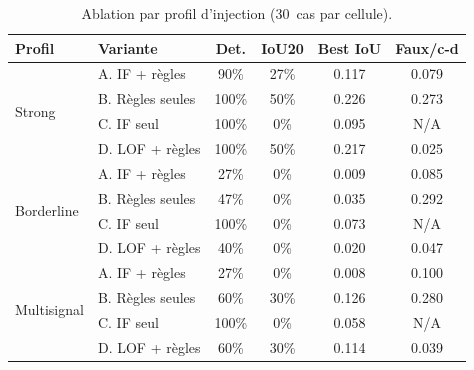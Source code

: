 \begin{table}[H]
    \centering
    \caption{Ablation par profil d'injection (30~cas par cellule).}
    \label{tab:ablation_by_profile}
    \begin{tabular}{llcccc}
        \toprule
        \textbf{Profil} & \textbf{Variante} & \textbf{Det.} & \textbf{IoU20}
            & \textbf{Best IoU} & \textbf{Faux/c-d} \\
        \midrule
        \multirow{4}{*}{Strong}
            & A. IF + règles   & 90\%  & 27\% & 0.117 & 0.079 \\
            & B. Règles seules & 100\% & 50\% & 0.226 & 0.273 \\
            & C. IF seul       & 100\% & 0\%  & 0.095 & N/A \\
            & D. LOF + règles  & 100\% & 50\% & 0.217 & 0.025 \\
        \midrule
        \multirow{4}{*}{Borderline}
            & A. IF + règles   & 27\%  & 0\%  & 0.009 & 0.085 \\
            & B. Règles seules & 47\%  & 0\%  & 0.035 & 0.292 \\
            & C. IF seul       & 100\% & 0\%  & 0.073 & N/A \\
            & D. LOF + règles  & 40\%  & 0\%  & 0.020 & 0.047 \\
        \midrule
        \multirow{4}{*}{Multisignal}
            & A. IF + règles   & 27\%  & 0\%  & 0.008 & 0.100 \\
            & B. Règles seules & 60\%  & 30\% & 0.126 & 0.280 \\
            & C. IF seul       & 100\% & 0\%  & 0.058 & N/A \\
            & D. LOF + règles  & 60\%  & 30\% & 0.114 & 0.039 \\
        \bottomrule
    \end{tabular}
\end{table}

